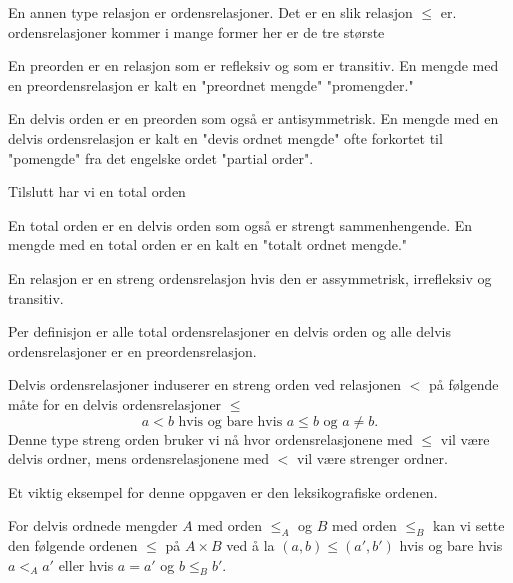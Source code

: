 En annen type relasjon er ordensrelasjoner. Det er en slik relasjon $\leq$ er. ordensrelasjoner kommer i mange former her er de tre største

\begin{definisjon}\label{Def:Preord}
    En preorden er en relasjon som er refleksiv og som er transitiv. En mengde med en preordensrelasjon er kalt en "preordnet mengde" "promengder."
\end{definisjon}

\begin{definisjon}\label{Def:Partord}
    En delvis orden er en preorden som også er antisymmetrisk. En mengde med en delvis ordensrelasjon er kalt en "devis ordnet mengde" ofte forkortet til "pomengde" fra det engelske ordet "partial order".
\end{definisjon}

Tilslutt har vi en total orden

\begin{definisjon}\label{Def:Totord}
    En total orden er en delvis orden som også er strengt sammenhengende. En mengde med en total orden er en kalt en "totalt ordnet mengde."
\end{definisjon}

\begin{definisjon}\label{Def:Strengord}
    En relasjon er en streng ordensrelasjon hvis den er assymmetrisk, irrefleksiv og transitiv.
\end{definisjon}

\begin{bemerk}\label{Rem:OrdRelHiriarki}
Per definisjon er alle total ordensrelasjoner en delvis orden og alle delvis ordensrelasjoner er en preordensrelasjon.
\end{bemerk}

\begin{bemerk}\label{Rem:Strengord}
    Delvis ordensrelasjoner induserer en streng orden ved relasjonen $<$ på følgende måte for en delvis ordensrelasjoner $\leq$
    \[a<b \text{ hvis og bare hvis } a\leq b \text{ og } a\neq b.\]
    Denne type streng orden bruker vi nå hvor ordensrelasjonene med $\leq$ vil være delvis ordner, mens ordensrelasjonene med $<$ vil være strenger ordner.
\end{bemerk}

Et viktig eksempel for denne oppgaven er den leksikografiske ordenen.

\begin{eksempel}\label{Ex:LeksOrd}
    For delvis ordnede mengder $A$ med orden $\leq_A$ og $B$ med orden $\leq_B$ kan vi sette den følgende ordenen $\leq$ på $A\times B$ ved å la $(a,b)\leq (a',b')$ hvis og bare hvis $a<_A a'$ eller hvis $a=a'$ og $b\leq_B b'$. 
\end{eksempel}

